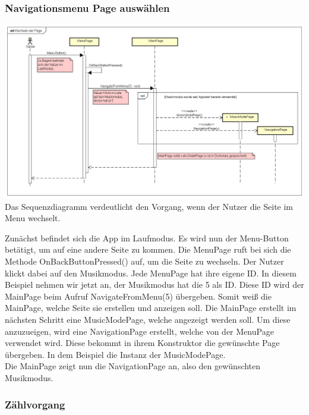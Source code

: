 \documentclass[a4paper,12pt]{article}
\begin{document}
\newpage
\subsubsection{Navigationsmenu Page auswählen}

\includegraphics[width=1.1\textwidth]{./Diagramme/NavigationsMenuSeqDia.png}\\
Das Sequenzdiagramm verdeutlicht den Vorgang, wenn der Nutzer die Seite im Menu wechselt.

Zunächst befindet sich die App im Laufmodus. Es wird nun der Menu-Button betätigt, um auf eine andere Seite zu kommen. Die MenuPage ruft bei sich die Methode OnBackButtonPressed() auf, um die Seite zu wechseln. 
Der Nutzer klickt dabei auf den Musikmodus. Jede MenuPage hat ihre eigene ID. In diesem Beispiel nehmen wir jetzt an, der Musikmodus hat die 5 als ID. Diese ID wird der MainPage beim Aufruf NavigateFromMenu(5) übergeben. Somit weiß die MainPage, welche Seite sie erstellen und anzeigen soll.
Die MainPage erstellt im nächsten Schritt eine MusicModePage, welche angezeigt werden soll. Um diese anzuzueigen, wird eine NavigationPage erstellt, welche von der MenuPage verwendet wird. Diese bekommt in ihrem Konstruktor die gewünschte Page übergeben. In dem Beispiel die Instanz der MusicModePage. \\

Die MainPage zeigt nun die NavigationPage an, also den gewünschten Musikmodus.


\subsubsection{Zählvorgang}
\end{document}
